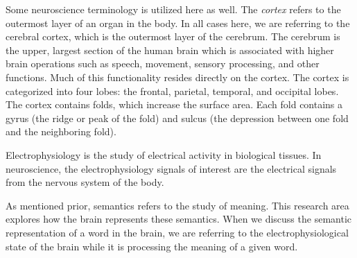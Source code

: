 Some neuroscience terminology is utilized here as well. The \emph{cortex} 
refers to the outermost layer of an organ in the body. In all cases here, we 
are referring to the cerebral cortex, which is the outermost layer of the 
cerebrum. The cerebrum is the upper, largest section of the human brain which 
is associated with higher brain operations such as speech, movement, sensory 
processing, and other functions. Much of this functionality resides directly on 
the cortex. The cortex is categorized into four lobes: the frontal, parietal, 
temporal, and occipital lobes. The cortex contains folds, which increase the 
surface area. Each fold contains a gyrus (the ridge or peak of the fold) and 
sulcus (the depression between one fold and the neighboring fold).

Electrophysiology is the study of electrical activity in biological tissues. In 
neuroscience, the electrophysiology signals of interest are the electrical 
signals from the nervous system of the body.

As mentioned prior, semantics refers to the study of meaning. This research 
area explores how the brain represents these semantics. When we discuss the 
semantic representation of a word in the brain, we are referring to the 
electrophysiological state of the brain while it is processing the meaning of a 
given word.
